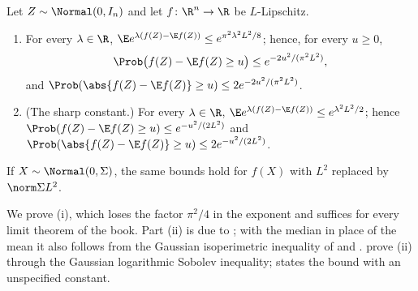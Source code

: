 \begin{refsection}
\begin{theorem}\label{thm:toolkit:lipschitz}
Let $Z\sim\Normal(0,I_n)$ and let $f\colon\R^n\to\R$ be $L$-Lipschitz.
\begin{enumerate}
\item For every $\lambda\in\R$, $\E e^{\lambda(f(Z)-\E f(Z))}\le e^{\pi^2\lambda^2L^2/8}$; hence, for every $u\ge0$,
\[
\Prob\bigl(f(Z)-\E f(Z)\ge u\bigr)\le e^{-2u^2/(\pi^2L^2)},
\]
and $\Prob(\abs{f(Z)-\E f(Z)}\ge u)\le2e^{-2u^2/(\pi^2L^2)}$.
\item (The sharp constant.) For every $\lambda\in\R$, $\E e^{\lambda(f(Z)-\E f(Z))}\le e^{\lambda^2L^2/2}$; hence $\Prob(f(Z)-\E f(Z)\ge u)\le e^{-u^2/(2L^2)}$ and $\Prob(\abs{f(Z)-\E f(Z)}\ge u)\le2e^{-u^2/(2L^2)}$.
\end{enumerate}
If $X\sim\Normal(0,\Sigma)$, the same bounds hold for $f(X)$ with $L^2$ replaced by $\norm\Sigma L^2$.
\end{theorem}

We prove (i), which loses the factor $\pi^2/4$ in the exponent and suffices for every limit theorem of the book. Part (ii) is due to \textcite{TsirelsonIbragimovSudakov1976}; with the median in place of the mean it also follows from the Gaussian isoperimetric inequality of \textcite{Borell1975} and \textcite{SudakovTsirelson1978}. \Textcite[Chapter~5]{BoucheronLugosiMassart2013} prove (ii) through the Gaussian logarithmic Sobolev inequality; \textcite[Theorem~5.2.2]{Vershynin2018} states the bound with an unspecified constant.


\end{refsection}
